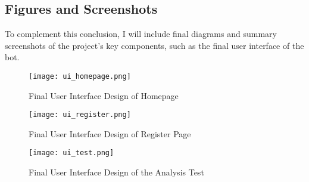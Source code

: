 \documentclass[a4paper,12pt]{report}
\begin{document}
\subsection*{Figures and Screenshots}
To complement this conclusion, I will include final diagrams and summary screenshots of the project's key components, such as the final user interface of the bot.

\begin{figure}[H]
    \centering
    \texttt{[image: ui\_homepage.png]}
    \caption{Final User Interface Design of Homepage}
    \label{fig:final-ui-design}
\end{figure}

\begin{figure}[H]
    \centering
    \texttt{[image: ui\_register.png]}
    \caption{Final User Interface Design of Register Page}
    \label{fig:final-ui-design}
\end{figure}

\begin{figure}[H]
    \centering
    \texttt{[image: ui\_test.png]}
    \caption{Final User Interface Design of the Analysis Test}
    \label{fig:final-ui-design}
\end{figure}
\end{document}
